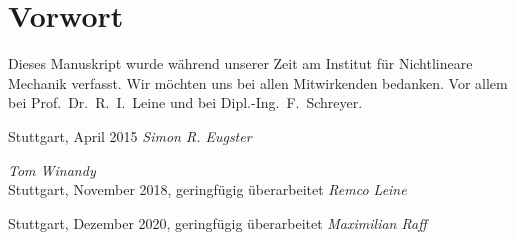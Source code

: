 \chapter*{Vorwort}
Dieses Manuskript wurde während unserer Zeit am Institut für Nichtlineare Mechanik verfasst. Wir möchten uns bei allen Mitwirkenden bedanken. Vor allem bei Prof.~Dr.~R.~I.~Leine und bei Dipl.-Ing.~F.~Schreyer.


\vspace{1cm}

\noindent Stuttgart, April 2015 \hfill \textit{Simon R. Eugster}

\hfill \textit{Tom Winandy}
\\

\noindent Stuttgart, November 2018, geringfügig überarbeitet \hfill \textit{Remco Leine}

\noindent Stuttgart, Dezember 2020, geringfügig überarbeitet \hfill \textit{Maximilian Raff}
